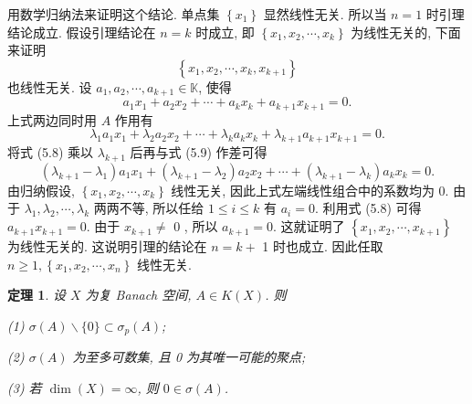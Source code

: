 \documentclass[openany]{ctexbook}
\makeatletter
\theoremstyle{kaiti}
\newtheorem{theorem}{定理}[section]
\theoremstyle{normal}
\renewenvironment{proof}[1][\proofname]{\par
    \pushQED{\qed}%
    \normalfont \topsep6\p@\@plus6\p@\relax
    \trivlist
    \item\relax
    {\heiti #1}\hspace{2\labelsep}\ignorespaces
  }{%
    \popQED\endtrivlist\@endpefalse
  }
\makeatother
\begin{document}
\begin{proof}
用数学归纳法来证明这个结论. 单点集 $\left\{x_1\right\}$ 显然线性无关. 所以当 $n=1$ 时引理结论成立. 假设引理结论在 $n=k$ 时成立, 即 $\left\{x_1, x_2, \cdots, x_{k}\right\}$ 为线性无关的, 下面来证明
$$
\left\{x_1, x_2, \cdots, x_{k}, x_{k+1}\right\}
$$
也线性无关. 设 $a_1, a_2, \cdots, a_{k+1} \in \mathbb{K}$, 使得
\begin{equation}
  a_1 x_1+a_2 x_2+\cdots+a_{k} x_{k}+a_{k+1} x_{k+1}=0.
\end{equation}
上式两边同时用 $A$ 作用有
\begin{equation}
  \lambda_1 a_1 x_1+\lambda_2 a_2 x_2+\cdots+\lambda_{k} a_{k} x_{k}+\lambda_{k+1} a_{k+1} x_{k+1}=0.
\end{equation}
将式 (5.8) 乘以 $\lambda_{k+1}$ 后再与式 (5.9) 作差可得
$$
\left(\lambda_{k+1}-\lambda_1\right) a_1 x_1+\left(\lambda_{k+1}-\lambda_2\right) a_2 x_2+\cdots+\left(\lambda_{k+1}-\lambda_{k}\right) a_{k} x_{k}=0.
$$
由归纳假设, $\left\{x_1, x_2, \cdots, x_{k}\right\}$ 线性无关, 因此上式左端线性组合中的系数均为 0. 由于 $\lambda_1,\lambda_2, \cdots, \lambda_{k}$ 两两不等, 所以任给 $1 \leqslant i \leqslant k$ 有 $a_{i}=0$. 利用式 (5.8) 可得 $a_{k+1} x_{k+1}=0$. 由于 $x_{k+1} \neq$ 0 , 所以 $a_{k+1}=0$. 这就证明了 $\left\{x_1, x_2, \cdots, x_{k+1}\right\}$ 为线性无关的. 这说明引理的结论在 $n=k+$ 1 时也成立. 因此任取 $n \geqslant 1,\left\{x_1, x_2, \cdots, x_n\right\}$ 线性无关.
\end{proof}

\begin{theorem}
设 $X$ 为复 Banach 空间, $A \in K(X)$. 则

(1) $\sigma(A) \backslash\{0\} \subset \sigma_{p}(A)$;

(2) $\sigma(A)$ 为至多可数集, 且 0 为其唯一可能的聚点;

(3) 若 $\operatorname{dim}(X)=\infty$, 则 $0 \in \sigma(A)$.
\end{theorem}
\end{document}
